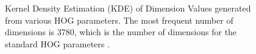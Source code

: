 \begin{figure}
    
    \caption{Kernel Density Estimation (KDE) of Dimension Values generated from various HOG parameters. The most frequent number of dimensions is 3780, which is the number of dimensions for the standard HOG parameters \cite{dalal_2005_histograms}.}
    \label{fig:dimension_distribution}
\end{figure}